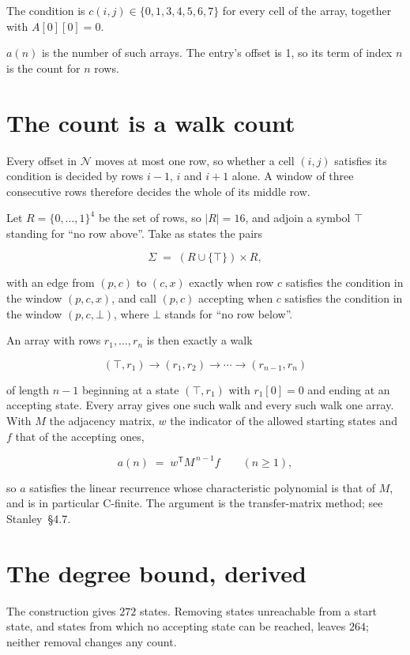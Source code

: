 \documentclass[11pt]{article}
\theoremstyle{definition}
\begin{document}
The condition is $c(i,j) \in \{0, 1, 3, 4, 5, 6, 7\}$ for every cell of the array, together with $A[0][0]=0$.

$a(n)$ is the number of such arrays. The entry's offset is 1, so its term of index $n$ is the count for $n$ rows.

\section{The count is a walk count}

Every offset in $\mathcal{N}$ moves at most one row, so whether a cell $(i,j)$ satisfies its condition is decided by rows $i-1$, $i$ and $i+1$ alone. A window of three consecutive rows therefore decides the whole of its middle row.

Let $R = \{0,\dots,1\}^{4}$ be the set of rows, so $|R| = 16$, and adjoin a symbol $\top$ standing for ``no row above''. Take as states the pairs

\[\Sigma \;=\; (R \cup \{\top\}) \times R,\]

with an edge from $(p,c)$ to $(c,x)$ exactly when row $c$ satisfies the condition in the window $(p,c,x)$, and call $(p,c)$ accepting when $c$ satisfies the condition in the window $(p,c,\bot)$, where $\bot$ stands for ``no row below''.

An array with rows $r_1,\dots,r_n$ is then exactly a walk

\[(\top,r_1) \to (r_1,r_2) \to \cdots \to (r_{n-1},r_n)\]

of length $n-1$ beginning at a state $(\top,r_1)$ with $r_1[0]=0$ and ending at an accepting state. Every array gives one such walk and every such walk one array. With $M$ the adjacency matrix, $w$ the indicator of the allowed starting states and $f$ that of the accepting ones,

\[a(n) \;=\; w^{\mathsf T} M^{\,n-1} f \qquad (n \ge 1),\]

so $a$ satisfies the linear recurrence whose characteristic polynomial is that of $M$, and is in particular C-finite. The argument is the transfer-matrix method; see Stanley~\S4.7.

\section{The degree bound, derived}

The construction gives $272$ states. Removing states unreachable from a start state, and states from which no accepting state can be reached, leaves $264$; neither removal changes any count.
\end{document}

